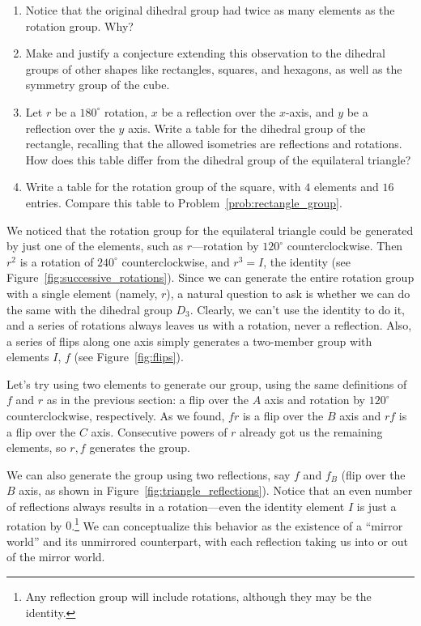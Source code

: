 \documentclass[../textbook.tex]{subfiles}
\begin{document}
\begin{enumerate}
\item Notice that the original dihedral group had twice as many elements as the rotation group. Why?
\item Make and justify a conjecture extending this observation to the dihedral groups of other shapes like rectangles, squares, and hexagons, as well as the symmetry group of the cube.
\item Let $r$ be a $180^{\circ}$ rotation, $x$ be a reflection over the $x$-axis, and $y$ be a reflection over the $y$ axis. Write a table for the dihedral group of the rectangle, recalling that the allowed isometries are reflections and rotations. How does this table differ from the dihedral group of the equilateral triangle? \label{prob:rectangle_group}
\item Write a table for the rotation group of the square, with $4$ elements and $16$ entries. Compare this table to Problem~\ref{prob:rectangle_group}.
\setcounter{problem_i}{\value{enumi}}
\end{enumerate}

\noindent We noticed that the rotation group for the equilateral triangle could be generated by just one of the elements, such as $r$---rotation by $120^{\circ}$ counterclockwise. Then $r^2$ is a rotation of $240^{\circ}$ counterclockwise, and $r^3=I$, the identity (see Figure~\ref{fig:successive_rotations}). Since we can generate the entire rotation group with a single element (namely, $r$), a natural question to ask is whether we can do the same with the dihedral group $D_3$. Clearly, we can't use the identity to do it, and a series of rotations always leaves us with a rotation, never a reflection. Also, a series of flips along one axis simply generates a two-member group with elements $I$, $f$ (see Figure~\ref{fig:flips}).

Let's try using two elements to generate our group, using the same definitions of $f$ and $r$ as in the previous section: a flip over the $A$ axis and rotation by $120^{\circ}$ counterclockwise, respectively. As we found, $fr$ is a flip over the $B$ axis and $rf$ is a flip over the $C$ axis. Consecutive powers of $r$ already got us the remaining elements, so ${r,f}$ generates the group.

We can also generate the group using two reflections, say $f$ and $f_B$ (flip over the $B$ axis, as shown in Figure~\ref{fig:triangle_reflections}). Notice that an even number of reflections always results in a rotation---even the identity element $I$ is just a rotation by $0$.\footnote{Any reflection group will include rotations, although they may be the identity.} We can conceptualize this behavior as the existence of a ``mirror world'' and its unmirrored counterpart, with each reflection taking us into or out of the mirror world.
\end{document}
